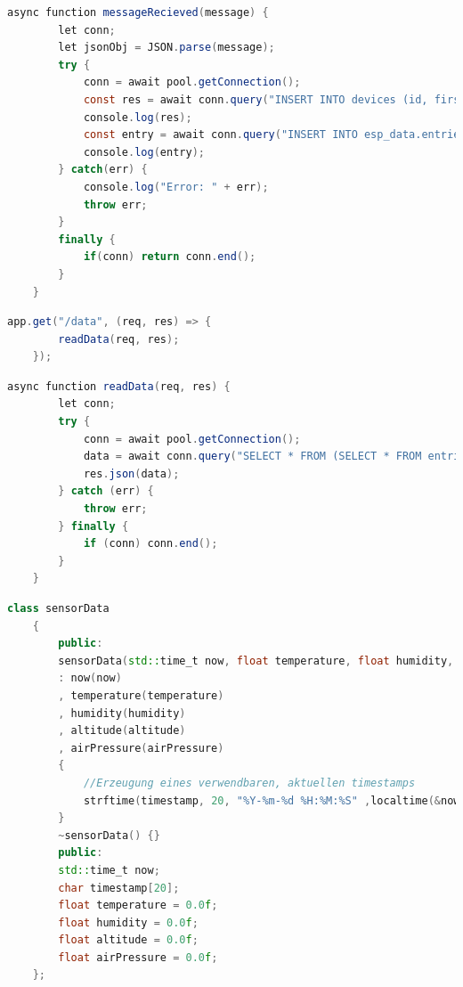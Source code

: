 \begin{lstlisting}[language=java, caption={Funktion: messageRecieved}, label=lst:function_message_recieved]
	async function messageRecieved(message) {
		let conn;
		let jsonObj = JSON.parse(message);
		try {
			conn = await pool.getConnection();
			const res = await conn.query("INSERT INTO devices (id, first_entry, last_entry) VALUES (?, ?, ?) ON DUPLICATE KEY UPDATE last_entry = VALUES (last_entry);", [jsonObj.device_id, jsonObj.timestamp, jsonObj.timestamp]);
			console.log(res);
			const entry = await conn.query("INSERT INTO esp_data.entries (esp_id, altitude, pressure, temperature, humidity, recorded_at) VALUES (?, ?, ?, ?, ?, ?);", [jsonObj.device_id, jsonObj.altitude, jsonObj.airPressure, jsonObj.temperature, jsonObj.humidity, jsonObj.timestamp]);
			console.log(entry);
		} catch(err) {
			console.log("Error: " + err);
			throw err;
		}
		finally {
			if(conn) return conn.end();
		}
	}
\end{lstlisting}

\begin{lstlisting}[language=java, caption={Route: getData}, label=lst:route_get_data]
	app.get("/data", (req, res) => {
		readData(req, res);
	});
\end{lstlisting}

\begin{lstlisting}[language=java, caption={Funktion: readData}, label=lst:function_read_data]
	async function readData(req, res) {
		let conn;
		try {
			conn = await pool.getConnection();
			data = await conn.query("SELECT * FROM (SELECT * FROM entries ORDER BY recorded_at DESC LIMIT 1000) AS subquery ORDER BY id ASC;");
			res.json(data);
		} catch (err) {
			throw err;
		} finally {
			if (conn) conn.end();
		}
	}
\end{lstlisting}

\begin{lstlisting}[language=C++,caption={Klasse für Sensordaten}, label=lst:class_sensordata]
	class sensorData
	{
		public:
		sensorData(std::time_t now, float temperature, float humidity, float altitude, float airPressure)
		: now(now)
		, temperature(temperature)
		, humidity(humidity)
		, altitude(altitude)
		, airPressure(airPressure)
		{
			//Erzeugung eines verwendbaren, aktuellen timestamps
			strftime(timestamp, 20, "%Y-%m-%d %H:%M:%S" ,localtime(&now));
		}
		~sensorData() {}
		public:
		std::time_t now;
		char timestamp[20];
		float temperature = 0.0f;
		float humidity = 0.0f;
		float altitude = 0.0f;
		float airPressure = 0.0f;
	};
\end{lstlisting}

